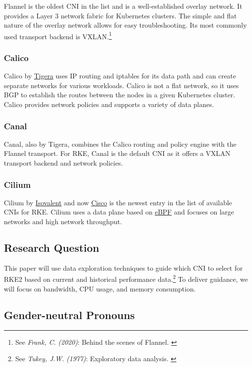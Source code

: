 Flannel is the oldest CNI in the list and is a well-established overlay network. It provides a Layer 3 network fabric for Kubernetes clusters. The simple and flat nature of the overlay network allows for easy troubleshooting. Its most commonly used transport backend is VXLAN.\footnote{See \textit{Frank, C. (2020)}: Behind the scenes of Flannel. \cite{flannel}}

\subsubsection{Calico}

Calico by \href{https://www.tigera.io/}{Tigera} uses IP routing and iptables for its data path and can create separate networks for various workloads. Calico is not a flat network, so it uses BGP to establish the routes between the nodes in a given Kubernetes cluster. Calico provides network policies and supports a variety of data planes.

\subsubsection{Canal}

Canal, also by Tigera, combines the Calico routing and policy engine with the Flannel transport. For RKE, Canal is the default CNI as it offers a VXLAN transport backend and network policies.

\subsubsection{Cilium}

Cilium by \href{https://isovalent.com/}{Isovalent} and now \href{https://www.cisco.com/}{Cisco} is the newest entry in the list of available CNIs for RKE. Cilium uses a data plane based on \href{https://ebpf.io/}{eBPF} and focuses on large networks and high network throughput.

\subsection{Research Question}

This paper will use data exploration techniques to guide which CNI to select for RKE2 based on current and historical performance data.\footnote{See \textit{Tukey, J.W. (1977)}: Exploratory data analysis. \cite{exploratoryDA}} To deliver guidance, we will focus on bandwidth, CPU usage, and memory consumption.

\subsection{Gender-neutral Pronouns}

